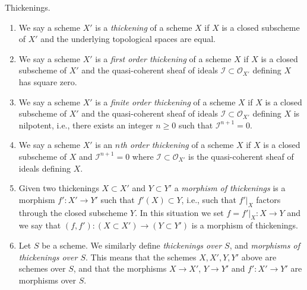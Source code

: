 \begin{definition}
\label{definition-thickening}
Thickenings.
\begin{enumerate}
\item We say a scheme $X'$ is a {\it thickening} of a scheme $X$ if
$X$ is a closed subscheme of $X'$ and the underlying topological spaces
are equal.
\item We say a scheme $X'$ is a {\it first order thickening} of a scheme $X$ if
$X$ is a closed subscheme of $X'$ and the quasi-coherent sheaf of ideals
$\mathcal{I} \subset \mathcal{O}_{X'}$ defining $X$ has square zero.
\item We say a scheme $X'$ is a {\it finite order thickening} of a scheme $X$
if $X$ is a closed subscheme of $X'$ and the quasi-coherent sheaf of ideals
$\mathcal{I} \subset \mathcal{O}_{X'}$ defining $X$ is nilpotent, i.e.,
there exists an integer $n \geq 0$ such that $\mathcal{I}^{n + 1} = 0$.
\item We say a scheme $X'$ is an {\it $n$th order thickening} of a scheme $X$
if $X$ is a closed subscheme of $X$ and $\mathcal{I}^{n + 1} = 0$
where $\mathcal{I} \subset \mathcal{O}_{X'}$ is the
quasi-coherent sheaf of ideals defining $X$.
\item Given two thickenings $X \subset X'$ and $Y \subset Y'$ a
{\it morphism of thickenings} is a morphism $f' : X' \to Y'$ such that
$f'(X) \subset Y$, i.e., such that $f'|_X$ factors through the closed
subscheme $Y$. In this situation we set $f = f'|_X : X \to Y$ and we say
that $(f, f') : (X \subset X') \to (Y \subset Y')$ is a morphism of
thickenings.
\item Let $S$ be a scheme. We similarly define {\it thickenings over $S$}, and
{\it morphisms of thickenings over $S$}. This means that the schemes
$X, X', Y, Y'$ above are schemes over $S$, and that the morphisms
$X \to X'$, $Y \to Y'$ and $f' : X' \to Y'$ are morphisms over $S$.
\end{enumerate}
\end{definition}